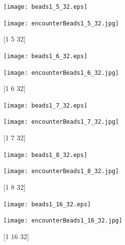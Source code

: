 \documentclass{article}
\begin{document}
				\begin{figure}[H]
					\begin{minipage}[t]{0.5\textwidth}
						\centering
						\texttt{[image: beads1\_5\_32.eps]}
					\end{minipage}%
					\begin{minipage}[t]{1.0\textwidth}
						\centering
						\texttt{[image: encounterBeads1\_5\_32.jpg]}						
					\end{minipage}
					\caption{[1 5 32]}
				\end{figure}
					\begin{figure}[H]
						\begin{minipage}[t]{0.5\textwidth}
							\centering
							\texttt{[image: beads1\_6\_32.eps]}
						\end{minipage}%
						\begin{minipage}[t]{1.0\textwidth}
							\centering
							\texttt{[image: encounterBeads1\_6\_32.jpg]}
						\end{minipage}
						\caption{[1 6 32]}
					\end{figure}
						\begin{figure}[H]
							\begin{minipage}[t]{0.5\textwidth}
								\centering
							\texttt{[image: beads1\_7\_32.eps]}
							\end{minipage}%
							\begin{minipage}[t]{1.0\textwidth}
								\centering
							\texttt{[image: encounterBeads1\_7\_32.jpg]}
							\end{minipage}
							\caption{[1 7 32]}
						\end{figure}
							\begin{figure}[H]
								\begin{minipage}[t]{0.5\textwidth}
									\centering
							\texttt{[image: beads1\_8\_32.eps]}
								\end{minipage}%
								\begin{minipage}[t]{1.0\textwidth}
									\centering
							\texttt{[image: encounterBeads1\_8\_32.jpg]}
								
								\end{minipage}
									\caption{[1 8 32]}
							\end{figure}
                            \begin{figure}[H]
                            \begin{minipage}[t]{0.5\textwidth}
                            	\centering
                            	\texttt{[image: beads1\_16\_32.eps]}
                            \end{minipage}%
                            \begin{minipage}[t]{1.0\textwidth}
                            	\centering
                            	\texttt{[image: encounterBeads1\_16\_32.jpg]}
                            	
                            \end{minipage}
                            \caption{[1 16 32]}
                            \end{figure}						
\end{document}
